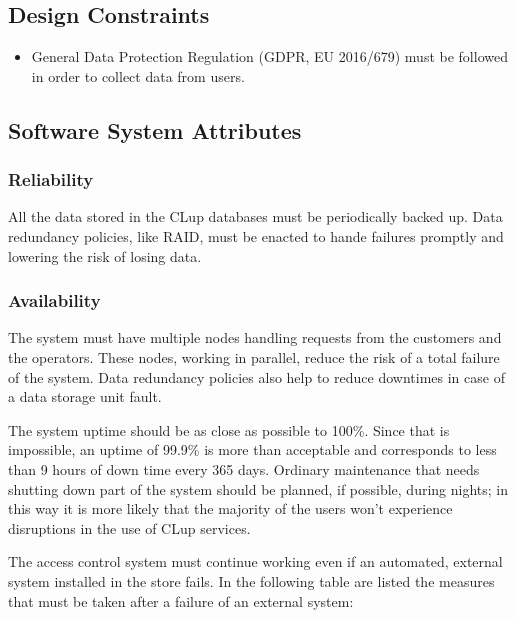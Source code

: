 \subsection{Design Constraints}

\begin{itemize}
    \item General Data Protection Regulation (GDPR, EU 2016/679) must be followed in order to collect data from users.
\end{itemize}

\subsection{Software System Attributes}
\subsubsection{Reliability}
All the data stored in the CLup databases must be periodically backed up. Data redundancy policies, like RAID, must be enacted to hande failures promptly and lowering the risk of losing data.

\subsubsection{Availability}
The system must have multiple nodes handling requests from the customers and the operators. These nodes, working in parallel, reduce the risk of a total failure of the system. Data redundancy policies also help to reduce downtimes in case of a data storage unit fault.

\smallskip

The system uptime should be as close as possible to 100\%. Since that is impossible, an uptime of 99.9\% is more than acceptable and corresponds to less than 9 hours of down time every 365 days.
Ordinary maintenance that needs shutting down part of the system should be planned, if possible, during nights; in this way it is more likely that the majority of the users won't experience disruptions in the use of CLup services.

\smallskip

The access control system must continue working even if an automated, external system installed in the store fails. In the following table are listed the measures that must be taken after a failure of an external system:
\smallskip

